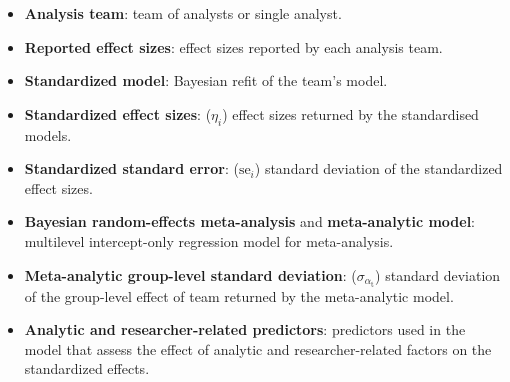 \documentclass[Review,times,sageh]{sagej}
\providecommand{\tightlist}{\setlength{\itemsep}{0pt}\setlength{\parskip}{0pt}}
\begin{document}
\begin{itemize}
\tightlist
\item
  \textbf{Analysis team}: team of analysts or single analyst.
\item
  \textbf{Reported effect sizes}: effect sizes reported by each analysis team.
\item
  \textbf{Standardized model}: Bayesian refit of the team's model.
\item
  \textbf{Standardized effect sizes}: (\(\eta_i\)) effect sizes returned by the standardised models.
\item
  \textbf{Standardized standard error}: (\(\text{se}_i\)) standard deviation of the standardized effect sizes.
\item
  \textbf{Bayesian random-effects meta-analysis} and \textbf{meta-analytic model}: multilevel intercept-only regression model for meta-analysis.
\item
  \textbf{Meta-analytic group-level standard deviation}: (\(\sigma_{\alpha_{\text{t}}}\)) standard deviation of the group-level effect of team returned by the meta-analytic model.
\item
  \textbf{Analytic and researcher-related predictors}: predictors used in the model that assess the effect of analytic and researcher-related factors on the standardized effects.
\end{itemize}



\end{document}
